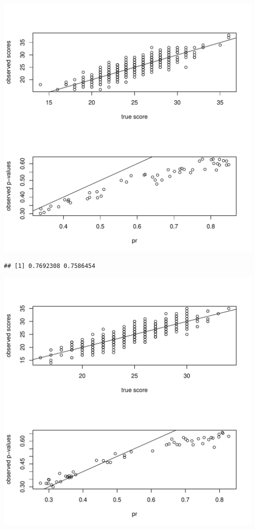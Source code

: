 \documentclass{article}\usepackage[]{graphicx}\usepackage[]{color}
\makeatletter
\def\maxwidth{ %
  \ifdim\Gin@nat@width>\linewidth
    \linewidth
  \else
    \Gin@nat@width
  \fi
}
\newenvironment{kframe}{%
 \def\at@end@of@kframe{}%
 \ifinner\ifhmode%
  \def\at@end@of@kframe{\end{minipage}}%
  \begin{minipage}{\columnwidth}%
 \fi\fi%
 \def\FrameCommand##1{\hskip\@totalleftmargin \hskip-\fboxsep
 \colorbox{shadecolor}{##1}\hskip-\fboxsep
     \hskip-\linewidth \hskip-\@totalleftmargin \hskip\columnwidth}%
 \MakeFramed {\advance\hsize-\width
   \@totalleftmargin\z@ \linewidth\hsize
   \@setminipage}}%
 {\par\unskip\endMakeFramed%
 \at@end@of@kframe}
\newenvironment{knitrout}{}{} %
\makeatother
\begin{document}
\begin{knitrout}
\includegraphics[width=\maxwidth]{figure/unnamed-chunk-2-2} 
\begin{kframe}\begin{verbatim}
## [1] 0.7692308 0.7586454
\end{verbatim}
\end{kframe}
\includegraphics[width=\maxwidth]{figure/unnamed-chunk-2-3} 

\end{knitrout}
\end{document}
